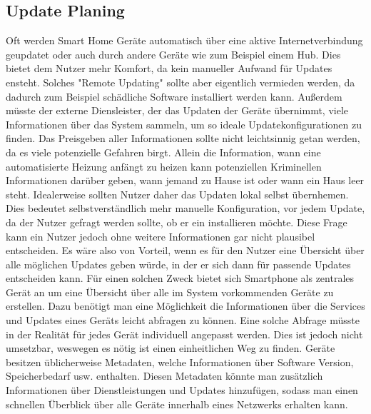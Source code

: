 \subsection{Update Planing}
Oft werden Smart Home Geräte automatisch über eine aktive Internetverbindung geupdatet oder auch durch andere
Geräte wie zum Beispiel einem Hub. Dies bietet dem Nutzer mehr Komfort, da kein manueller Aufwand für Updates ensteht.
Solches "Remote Updating" sollte aber eigentlich vermieden werden, da dadurch zum Beispiel schädliche Software installiert werden
kann. Außerdem müsste der externe Diensleister, der das Updaten der Geräte übernimmt, viele Informationen über das System sammeln,
um so ideale Updatekonfigurationen zu finden. Das Preisgeben aller Informationen sollte nicht leichtsinnig getan werden, da es viele
potenzielle Gefahren birgt. Allein die Information, wann eine automatisierte Heizung anfängt zu heizen kann potenziellen Kriminellen Informationen
darüber geben, wann jemand zu Hause ist oder wann ein Haus leer steht. 
Idealerweise sollten Nutzer daher das Updaten lokal selbst übernhemen. Dies bedeutet selbstverständlich mehr manuelle Konfiguration,
vor jedem Update, da der Nutzer gefragt werden sollte, ob er ein installieren möchte. Diese Frage kann ein Nutzer jedoch ohne weitere Informationen
gar nicht plausibel entscheiden. Es wäre also von Vorteil, wenn es für den Nutzer
eine Übersicht über alle möglichen Updates geben würde, in der er sich dann für passende Updates entscheiden kann. 
Für einen solchen Zweck bietet sich Smartphone als zentrales Gerät an um eine Übersicht über alle im 
System vorkommenden Geräte zu erstellen.
Dazu benötigt man eine Möglichkeit die Informationen über die Services und Updates eines Geräts leicht abfragen zu können.
Eine solche Abfrage müsste in der Realität für jedes Gerät individuell angepasst werden. Dies ist jedoch nicht umsetzbar,
weswegen es nötig ist einen einheitlichen Weg zu finden. Geräte besitzen üblicherweise Metadaten, welche Informationen über 
Software Version, Speicherbedarf usw. enthalten. Diesen Metadaten könnte man zusätzlich Informationen über Dienstleistungen und Updates 
hinzufügen, sodass man einen schnellen Überblick über alle Geräte innerhalb eines Netzwerks erhalten kann.

